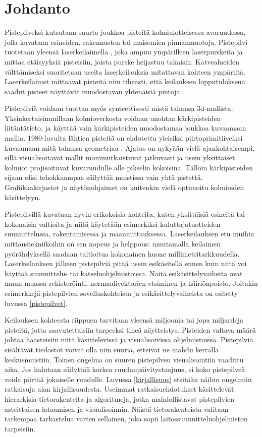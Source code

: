 \section{Johdanto}

Pistepilveksi kutsutaan suurta joukkoa pisteitä kolmiulotteisessa avaruudessa, jolla kuvataan esineiden, rakennusten tai maisemien pinnanmuotoja. Pistepilvi tuotetaan yleensä laserkeilaimella , joka ampuu ympärilleen laserpurskeita ja mittaa etäisyyksiä pisteisiin, joista purske heijastuu takaisin. Katvealueiden välttämiseksi suoritetaan useita laserkeilauksia mitattavan kohteen ympäriltä. Laserkeilaimet mittaavat pisteitä niin tiheästi, että keilauksen lopputuloksena saadut pisteet näyttävät muodostavan yhtenäisiä pintoja. 

Pistepilviä voidaan tuottaa myös synteettisesti mistä tahansa 3d-mallista. Yksinkertaisimmillaan kolmioverkosta voidaan unohtaa kärkipisteiden liitäntätieto, ja käyttää vain kärkipisteiden muodostamaa joukkoa kuvaamaan mallia. 1980-luvulta lähtien pisteitä on ehdotettu yleisiksi piirtoprimitiiveiksi kuvaamaan mitä tahansa geometriaa \cite{Whitted}. Ajatus on nykyään vielä ajankohtaisempi, sillä visualisoitavat mallit monimutkaistuvat jatkuvasti ja usein yksittäiset kolmiot projisoituvat kuvaruudulle alle pikselin kokoisina. Tällöin kärkipisteiden sijaan olisi tehokkaampaa säilyttää muistissa vain yhtä pistettä. Grafiikkakirjastot ja näytönohjaimet on kuitenkin vielä optimoitu kolmioiden käsittelyyn.

Pistepilvillä kuvataan hyvin erikokoisia kohteita, kuten yksittäisiä esineitä tai kokonaisia valtioita ja niitä käytetään esimerkiksi kuluttajatuotteiden suunnittelussa, rakentamisessa ja maanmittauksessa. Laserkeilauksen etu muihin mittaustekniikoihin on sen nopeus ja helppous: muutamalla keilaimen pyörähdyksellä saadaan taltioitua kokonainen huone millimetritarkkuudella. Laserkeilauksen jälkeen pistepilviä pitää usein esikäsitellä ennen kuin niitä voi käyttää suunnittelu- tai katseluohjelmistoissa. Näitä esikäsittelyvaiheita ovat muun muassa rekisteröinti, normaalivektorien etsiminen ja häiriönpoisto. Joitakin esimerkkejä pistepilvien sovelluskohteista ja esikäsittelyvaiheista on esitetty luvussa \ref{pistepilvet}.

Keilauksen kohteesta riippuen tarvitaan yleensä miljoonia tai jopa miljardeja pisteitä, jotta saavutettaisiin tarpeeksi tiheä näytteistys. Pisteiden valtava määrä johtaa haasteisiin niitä käsittelevissä ja visualisoivissa ohjelmistoissa. Pistepilviä sisältävät tiedostot voivat olla niin suuria, etteivät ne mahdu kerralla keskusmuistiin. Toinen ongelma on suuren pistepilven visualisointiin vaadittu aika. Jos halutaan säilyttää korkea ruudunpäivitystaajuus, ei koko pistepilveä voida piirtää jokaiselle ruudulle. Luvussa \ref{kirjallisuus} etsitään näihin ongelmiin ratkaisuja alan kirjallisuudesta. Useimmat ratkaisuehdotukset käsittelevät hierarkisia tietorakenteita ja algoritmeja, jotka mahdollistavat pistepilvien asteittaisen lataamisen ja visualisoinnin. Näistä tietorakenteista valitaan tarkempaa tarkastelua varten sellainen, joka sopii laitossuunnitteluohjelmiston tarpeisiin. 


